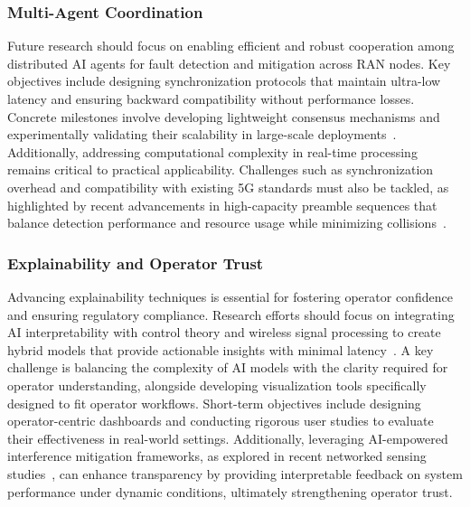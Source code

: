 \documentclass[sigconf]{acmart}
\begin{document}
\subsubsection{Multi-Agent Coordination}
Future research should focus on enabling efficient and robust cooperation among distributed AI agents for fault detection and mitigation across RAN nodes. Key objectives include designing synchronization protocols that maintain ultra-low latency and ensuring backward compatibility without performance losses. Concrete milestones involve developing lightweight consensus mechanisms and experimentally validating their scalability in large-scale deployments~\cite{ref21}. Additionally, addressing computational complexity in real-time processing remains critical to practical applicability. Challenges such as synchronization overhead and compatibility with existing 5G standards must also be tackled, as highlighted by recent advancements in high-capacity preamble sequences that balance detection performance and resource usage while minimizing collisions~\cite{ref21}.

\subsubsection{Explainability and Operator Trust}
Advancing explainability techniques is essential for fostering operator confidence and ensuring regulatory compliance. Research efforts should focus on integrating AI interpretability with control theory and wireless signal processing to create hybrid models that provide actionable insights with minimal latency~\cite{ref48}. A key challenge is balancing the complexity of AI models with the clarity required for operator understanding, alongside developing visualization tools specifically designed to fit operator workflows. Short-term objectives include designing operator-centric dashboards and conducting rigorous user studies to evaluate their effectiveness in real-world settings. Additionally, leveraging AI-empowered interference mitigation frameworks, as explored in recent networked sensing studies~\cite{ref48}, can enhance transparency by providing interpretable feedback on system performance under dynamic conditions, ultimately strengthening operator trust.
\end{document}
